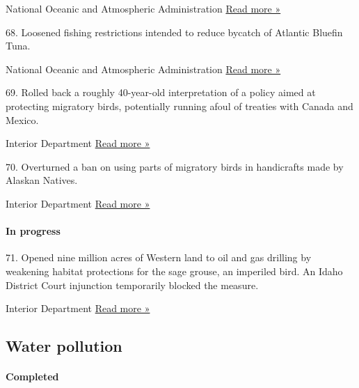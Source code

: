  National Oceanic and Atmospheric Administration \textbar{}
\href{https://eelp.law.harvard.edu/2017/10/pacific-bycatch-limits-for-whales-dolphins-and-sea-turtles/}{Read
more »}

68. Loosened fishing restrictions intended to reduce bycatch of Atlantic
Bluefin Tuna.

 National Oceanic and Atmospheric Administration \textbar{}
\href{https://eelp.law.harvard.edu/2019/10/atlantic-bluefin-tuna-protection-pelagic-longline-fishery-management/}{Read
more »}

69. Rolled back a roughly 40-year-old interpretation of a policy aimed
at protecting migratory birds, potentially running afoul of treaties
with Canada and Mexico.

 Interior Department \textbar{}
\href{https://www.washingtonpost.com/news/energy-environment/wp/2018/04/13/the-trump-administration-officially-clipped-the-wings-of-the-migratory-bird-treaty-act/}{Read
more »}

70. Overturned a ban on using parts of migratory birds in handicrafts
made by Alaskan Natives.

 Interior Department \textbar{}
\href{https://www.fws.gov/alaska/ambcc/News_files/NR\%2007-21-2017\%20Migratory\%20Birdpart\%20Native\%20Handicrafts\%20FINAL\%20DOI\%20(3).pdf}{Read
more »}

\hypertarget{in-progress-3}{%
\paragraph{In progress}\label{in-progress-3}}

71. Opened nine million acres of Western land to oil and gas drilling by
weakening habitat protections for the sage grouse, an imperiled bird. An
Idaho District Court injunction temporarily blocked the measure.

 Interior Department \textbar{}
\href{https://www.nytimes3xbfgragh.onion/2019/10/16/climate/trump-sage-grouse.html}{Read
more »}

\hypertarget{water-pollution}{%
\subsection{Water pollution}\label{water-pollution}}

\hypertarget{completed-4}{%
\paragraph{Completed}\label{completed-4}}

